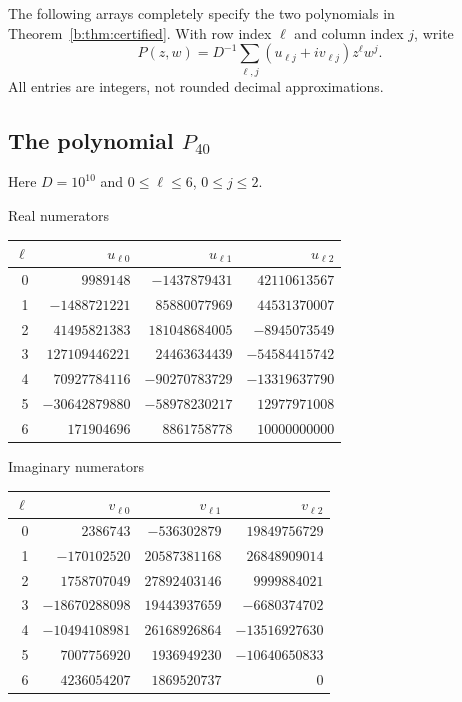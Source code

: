 \documentclass[UTF8,11pt]{ctexart}
\theoremstyle{definition}
\numberwithin{equation}{section}
\begin{document}
The following arrays completely specify the two polynomials in
Theorem~\ref{b:thm:certified}. With row index $\ell$ and column index
$j$, write
\[
 P(z,w)=D^{-1}\sum_{\ell,j}(u_{\ell j}+i v_{\ell j})z^\ell w^j.
\]
All entries are integers, not rounded decimal approximations.

\subsection*{The polynomial \texorpdfstring{$P_{40}$}{P40}}
Here $D=10^{10}$ and $0\le\ell\le 6$, $0\le j\le2$.

\begin{center}
\begin{minipage}{\textwidth}\centering
\small
Real numerators
\smallskip

\begin{tabular}{rrrr}
\toprule
$\ell$ & $u_{\ell0}$ & $u_{\ell1}$ & $u_{\ell2}$ \\
\midrule
0 & $9989148$ & $-1437879431$ & $42110613567$ \\
1 & $-1488721221$ & $85880077969$ & $44531370007$ \\
2 & $41495821383$ & $181048684005$ & $-8945073549$ \\
3 & $127109446221$ & $24463634439$ & $-54584415742$ \\
4 & $70927784116$ & $-90270783729$ & $-13319637790$ \\
5 & $-30642879880$ & $-58978230217$ & $12977971008$ \\
6 & $171904696$ & $8861758778$ & $10000000000$ \\
\bottomrule
\end{tabular}
\end{minipage}
\end{center}

\begin{center}
\begin{minipage}{\textwidth}\centering
\small
Imaginary numerators
\smallskip

\begin{tabular}{rrrr}
\toprule
$\ell$ & $v_{\ell0}$ & $v_{\ell1}$ & $v_{\ell2}$ \\
\midrule
0 & $2386743$ & $-536302879$ & $19849756729$ \\
1 & $-170102520$ & $20587381168$ & $26848909014$ \\
2 & $1758707049$ & $27892403146$ & $9999884021$ \\
3 & $-18670288098$ & $19443937659$ & $-6680374702$ \\
4 & $-10494108981$ & $26168926864$ & $-13516927630$ \\
5 & $7007756920$ & $1936949230$ & $-10640650833$ \\
6 & $4236054207$ & $1869520737$ & $0$ \\
\bottomrule
\end{tabular}
\end{minipage}
\end{center}
\end{document}

